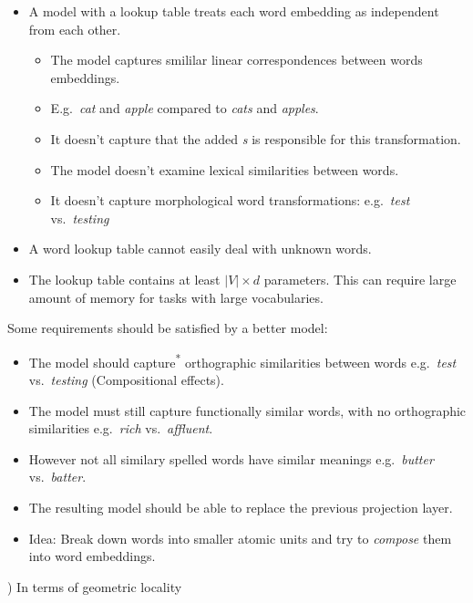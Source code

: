 \documentclass[11pt, a4paper, landscape]{article}
\begin{document}
\NewPage{}

\vfill
\begin{itemize}
\item A model with a lookup table treats each word embedding as independent from each other. 
\begin{itemize}
  \item The model captures smililar linear correspondences between words embeddings.
  \item E.g.\ \textit{cat} and \textit{apple} compared to \textit{cats} and \textit{apples}.
  \item It doesn't capture that the added \textit{s} is responsible for this transformation.
  \item The model doesn't examine lexical similarities between words.
  \item It doesn't capture morphological word transformations: e.g.\ \textit{test} vs.\ \textit{testing}
\end{itemize}
\item A word lookup table cannot easily deal with unknown words.
\item The lookup table contains at least $|V| \times d$ parameters. This can require large amount of memory for tasks with large vocabularies.
\end{itemize}
\vfill


\NewPage{}

\vfill
Some requirements should be satisfied by a better model:
\begin{itemize}
  \item The model should capture\textsuperscript{*} orthographic similarities between words
        e.g.\ \textit{test} vs.\ \textit{testing} (Compositional effects).
  \item The model must still capture functionally similar words, with no orthographic
        similarities e.g.\ \textit{rich} vs.\ \textit{affluent}.
  \item However not all similary spelled words have similar meanings e.g.\ \textit{butter} vs.\ \textit{batter}.
  \item The resulting model should be able to replace the previous projection layer.
  \item Idea: Break down words into smaller atomic units and try to \textit{compose} them into word embeddings.
\end{itemize}
\vfill
{\footnotesize *) In terms of geometric locality}
\end{document}
